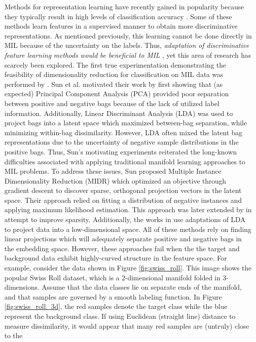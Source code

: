 Methods for representation learning have recently gained in popularity because they typically result in high levels of classification accuracy \citep{Bengio2014RepLearningReview}.  Some of these methods  learn features in a supervised manner to obtain more discriminative representations.  As mentioned previously, this learning cannot be done directly in  MIL because of the uncertainty on the labels.  Thus, \textit{adaptation of discriminative  feature learning methods would be beneficial to MIL} \citep{Carbonneau2016MILSurvey}, yet this area of research has scarcely been explored.  The first true experimentation demonstrating the feasibility of dimensionality reduction for classification on MIL data was performed by \citep{Sun2010MIDR}.  Sun et al. motivated their work by first showing that (as expected) Principal Component Analysis (PCA) provided poor separation between positive and negative bags because of the lack of utilized label information.  Additionally, Linear Discriminant Analysis (LDA) was used to project bags into a latent space which maximized between-bag separation, while minimizing within-bag dissimilarity.  However, LDA often mixed the latent bag representations due to the uncertainty of negative sample distributions in the positive bags.  Thus, Sun's motivating experiments  reiterated the long-known difficulties associated with applying traditional manifold learning approaches to MIL problems. To address these issues, Sun proposed Multiple Instance Dimensionality Reduction (MIDR) which optimized an objective through gradient descent to discover sparse, orthogonal projection vectors in the latent space.  Their approach relied on fitting a distribution of negative instances and applying maximum likelihood estimation.  This approach was later extended by \cite{Zhu2018MIDRSparsity} in attempt to improve sparsity.  Additionally, the works in \citep{Ping2010MILDRMaxMargin,Kim2010LocalDRMIL,Chai2014MIDA} use adaptations of LDA to project data into a low-dimensional space. All of these methods rely on finding linear projections which will adequately separate positive and negative bags in the embedding space.  However, these approaches fail when the the target and background data exhibit highly-curved structure in the feature space.  For example, consider the data shown in Figure \ref{fig:swiss_roll}.  This image shows the popular Swiss Roll dataset, which is a 2-dimensional manifold folded in 3-dimensions.  Assume that the data classes lie on separate ends of the manifold, and that samples are governed by a smooth labeling function.  In Figure \ref{fig:swiss_roll_3d}, the red samples denote the target class while the blue represent the background class.  If using Euclidean (straight line) distance to measure dissimilarity, it would appear that many red samples are (untruly) close to the 